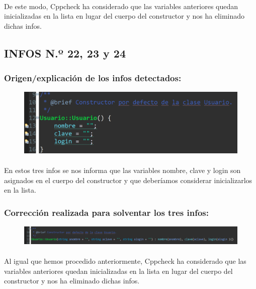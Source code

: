 			\paragraph{}De este modo, Cppcheck ha considerado que las variables anteriores quedan inicializadas en la lista en lugar del cuerpo del constructor y nos ha eliminado dichas infos.
			
	\subsection{INFOS N.º 22, 23 y 24}
	
		\subsubsection{Origen/explicación de los infos detectados:}
		
			\begin{figure}[H]
				\centering
				\includegraphics[scale=0.55]{img/esteban28.png}
				\label{esteban28}
			\end{figure}
		
			\paragraph{}En estos tres infos se nos informa que las variables nombre, clave y login son asignados en el cuerpo del constructor y que deberíamos considerar inicializarlos en la lista.
			
		\subsubsection{Corrección realizada para solventar los tres infos:}
		
			\begin{figure}[H]
				\centering
				\includegraphics[scale=0.55]{img/esteban29.png}
				\label{esteban29}
			\end{figure}
		
			\paragraph{}Al igual que hemos procedido anteriormente, Cppcheck ha considerado que las variables anteriores quedan inicializadas en la lista en lugar del cuerpo del constructor y nos ha eliminado dichas infos.
\newpage